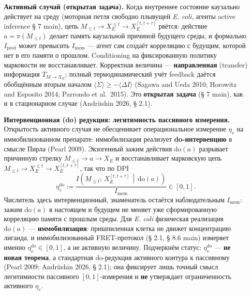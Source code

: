 \documentclass[pdflatex,sn-mathphys-ay]{sn-jnl}
\begin{document}
\textbf{Активный случай (открытая задача).} Когда внутреннее состояние каузально действует на среду (моторная петля свободно плывущей \emph{E. coli}, агенты active inference § 7 main), цепь \(M_{\le t} \to X_E^{\le t} \to X_E^{[t,t+\tau]}\) рвётся: действие \(a = \pi(M_{\le t})\) делает память каузальной причиной будущего среды, и формально \(I_{\text{pred}}\) может превысить \(I_{\text{mem}}\) --- агент сам создаёт корреляцию с будущим, которой нет в его памяти о прошлом. Conditioning на фиксированную политику марковости не восстанавливает. Корректная величина --- \textbf{направленная} (transfer) информация \(T_{M \to X_E}\); полный термодинамический учёт feedback даётся обобщённым вторым началом \(\langle\Sigma\rangle \ge -\langle\Delta I\rangle\) (Sagawa and Ueda 2010; Horowitz and Esposito 2014; Parrondo et al.~2015). Это \textbf{открытая задача} (§ 7 main), как и в стационарном случае (Andriishin 2026, § 2.1).



\textbf{Интервенционная (do) редукция: легитимность пассивного измерения.} Открытость активного случая не обесценивает операциональное измерение \(\eta_v\) на иммобилизованном препарате: иммобилизация реализует \textbf{do-интервенцию} в смысле Пирла (Pearl 2009). Экзогенный зажим действия \(\mathrm{do}(a)\) разрывает причинную стрелку \(M_{\le t} \to a \to X_E\) и восстанавливает марковскую цепь \(M_{\le t} \to X_E^{\le t} \to X_E^{[t,t+\tau]}\), так что по DPI \[\eta_v^{\mathrm{do}} := \frac{I\!\left(M_{\le t};\, X_E^{[t,t+\tau]} \,\middle|\, \mathrm{do}(a)\right)}{I_{\text{mem}}} \in [0,1].\] Числитель здесь интервенционный, знаменатель остаётся наблюдательным \(I_{\text{mem}}\): зажим \(\mathrm{do}(a)\) в настоящем и будущем не меняет уже сформированную корреляцию памяти с прошлым среды. Для \emph{E. coli} физическая реализация \(\mathrm{do}(a)\) --- \textbf{иммобилизация}: пришпиленная клетка не движет концентрацию лиганда, и иммобилизованный FRET-протокол (§ 2.1, § 8.6 main) измеряет именно \(\eta_v^{\mathrm{do}} \in [0,1]\), а не активную величину. Подчеркнём статус: \(\eta_v^{\mathrm{do}}\) --- \textbf{не новая теорема}, а стандартная do-редукция активного контура к пассивному (Pearl 2009; Andriishin 2026, § 2.1); она фиксирует лишь точный смысл легитимности пассивного \([0,1]\)-измерения и \textbf{не} утверждает ограниченность активного \(\eta_v\).
\end{document}
